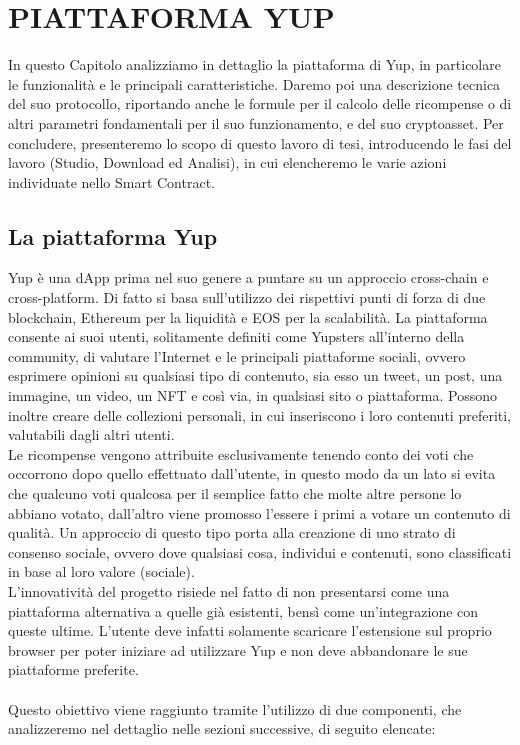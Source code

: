 \chapter{PIATTAFORMA YUP}
\label{platform_chapter}
In questo Capitolo analizziamo in dettaglio la piattaforma di Yup, in particolare le funzionalità e le principali caratteristiche. Daremo poi una descrizione tecnica del suo protocollo, riportando anche le formule per il calcolo delle ricompense o di altri parametri fondamentali per il suo funzionamento, e del suo cryptoasset. Per concludere, presenteremo lo scopo di questo lavoro di tesi, introducendo le fasi del lavoro (Studio, Download ed Analisi), in cui elencheremo le varie azioni individuate nello Smart Contract.

\section{La piattaforma Yup}
Yup è una dApp prima nel suo genere a puntare su un approccio cross-chain e cross-platform. Di fatto si basa sull'utilizzo dei rispettivi punti di forza di due blockchain, Ethereum per la liquidità e EOS per la scalabilità. La piattaforma consente ai suoi utenti, solitamente definiti come Yupsters all'interno della community,  di valutare l'Internet e le principali piattaforme sociali, ovvero esprimere opinioni su qualsiasi tipo di contenuto, sia esso un tweet, un post, una immagine, un video, un NFT e così via, in qualsiasi sito o piattaforma. Possono inoltre creare delle collezioni personali, in cui inseriscono i loro contenuti preferiti, valutabili dagli altri utenti. 
\\
Le ricompense vengono attribuite esclusivamente tenendo conto dei voti che occorrono dopo quello effettuato dall'utente, in questo modo da un lato si evita che qualcuno voti qualcosa per il semplice fatto che molte altre persone lo abbiano votato, dall'altro viene promosso l'essere i primi a votare un contenuto di qualità. Un approccio di questo tipo porta alla creazione di uno strato di consenso sociale, ovvero dove qualsiasi cosa, individui e contenuti, sono classificati in base al loro valore (sociale).
\\
L'innovatività del progetto risiede nel fatto di non presentarsi come una piattaforma alternativa a quelle già esistenti, bensì come un'integrazione con queste ultime. L'utente deve infatti solamente scaricare l'estensione sul proprio browser per poter iniziare ad utilizzare Yup e non deve abbandonare le sue piattaforme preferite.
\\
\\
Questo obiettivo viene raggiunto tramite l'utilizzo di due componenti, che analizzeremo nel dettaglio nelle sezioni successive, di seguito elencate:

